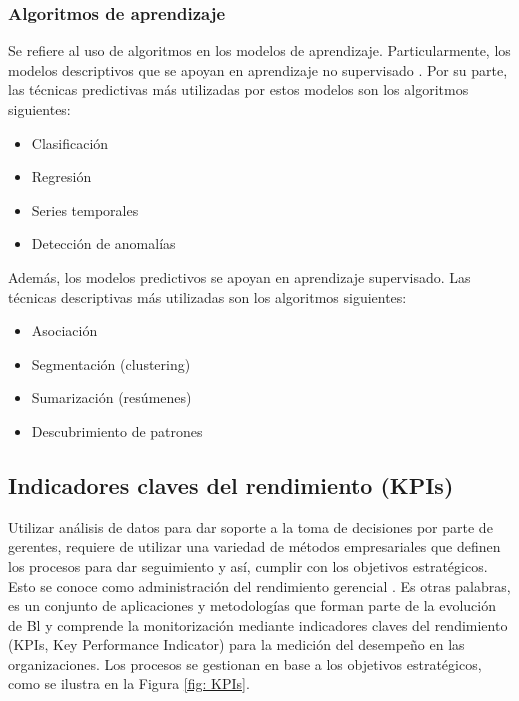\documentclass[11pt,titlepage]{report}
\begin{document}
\subsubsection{Algoritmos de aprendizaje}
Se refiere al uso de algoritmos en los modelos de aprendizaje. Particularmente, los modelos descriptivos que se apoyan en aprendizaje no supervisado \cite{lib02}. Por su parte, las técnicas predictivas más utilizadas por estos modelos son los algoritmos siguientes:

\begin{multicols}{2}
\begin{itemize}
\item Clasificación
\item Regresión
\item Series temporales
\item Detección de anomalías
\end{itemize}
\end{multicols}

Además, los modelos predictivos se apoyan en aprendizaje supervisado. Las técnicas descriptivas más utilizadas son los algoritmos siguientes:
\begin{multicols}{2}
\begin{itemize}
\item Asociación
\item Segmentación (clustering)
\item Sumarización (resúmenes)
\item Descubrimiento de patrones
\end{itemize}
\end{multicols}


\subsection{Indicadores claves del rendimiento (KPIs)}

Utilizar análisis de datos para dar soporte a la toma de decisiones por parte de gerentes, requiere de utilizar una variedad de métodos empresariales que definen los procesos para dar seguimiento y así, cumplir con los objetivos estratégicos. Esto se conoce como administración del rendimiento gerencial \cite{lib02}. Es otras palabras, es un conjunto de aplicaciones y metodologías que forman parte de la evolución de Bl y comprende la monitorización mediante indicadores claves del rendimiento (KPIs, Key Performance Indicator) para la medición del desempeño en las organizaciones. Los procesos se gestionan en base a los objetivos estratégicos, como se ilustra en la Figura \ref{fig: KPIs}.
\end{document}
